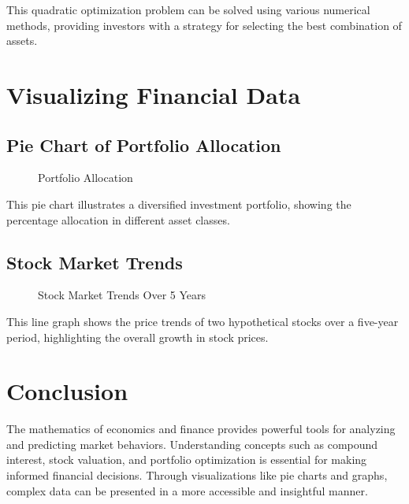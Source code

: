 \documentclass{article}
\begin{document}
This quadratic optimization problem can be solved using various numerical methods, providing investors with a strategy for selecting the best combination of assets.

\section{Visualizing Financial Data}

\subsection{Pie Chart of Portfolio Allocation}
\begin{figure}[h!]
	\centering
	\caption{Portfolio Allocation}
\end{figure}

This pie chart illustrates a diversified investment portfolio, showing the percentage allocation in different asset classes.

\subsection{Stock Market Trends}
\begin{figure}[h!]
	\centering
	\caption{Stock Market Trends Over 5 Years}
\end{figure}

This line graph shows the price trends of two hypothetical stocks over a five-year period, highlighting the overall growth in stock prices.

\section{Conclusion}
The mathematics of economics and finance provides powerful tools for analyzing and predicting market behaviors. Understanding concepts such as compound interest, stock valuation, and portfolio optimization is essential for making informed financial decisions. Through visualizations like pie charts and graphs, complex data can be presented in a more accessible and insightful manner.
\end{document}
